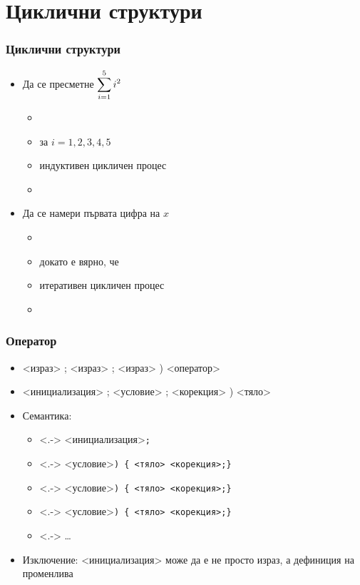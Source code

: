 \documentclass[alsotrans]{beamerswitch}
\begin{document}
\section{Циклични структури}

\begin{frame}
  \frametitle{Циклични структури}

  \begin{itemize}[<+->]
  \item Да се пресметне $\displaystyle\sum_{i=1}^5\limits i^2$
    \begin{itemize}
    \item {}
    \item {} за $i = 1, 2, 3, 4, 5$
    \item индуктивен цикличен процес
    \item {}
    \end{itemize}
  \item Да се намери първата цифра на $x$
    \begin{itemize}
    \item {}
    \item {} докато е вярно, че 
    \item итеративен цикличен процес
    \item {}
    \end{itemize}
  \end{itemize}
\end{frame}

\begin{frame}
  \frametitle{Оператор }

  \begin{itemize}[<+->]
  \item {} <израз> \tta; <израз> \tta; <израз> \tta) <оператор>
  \item {} <инициализация> \tta; <условие> \tta; <корекция> \tta) <тяло>
  \item Семантика:
    \begin{itemize}
    \item<.-> <инициализация>\tt;
    \item<.-> <условие>\tt{) \{} <тяло> <корекция>\tt{;\}}
    \item<.-> <условие>\tt{) \{} <тяло> <корекция>\tt{;\}}
    \item<.-> <условие>\tt{) \{} <тяло> <корекция>\tt{;\}}
    \item<.-> \ldots
    \end{itemize}
  \item \alert{Изключение:} <инициализация> може да е не просто израз, а дефиниция на променлива
  \end{itemize}
\end{frame}
\end{document}
